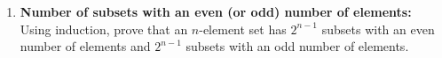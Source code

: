 \begin{enumerate}


\item \textbf{Number of subsets with an even (or odd) number of elements:}
Using induction, prove that an $n$-element set  has $2^{n-1}$ subsets
with an even number of elements and $2^{n-1}$ subsets with an odd number
of elements.

%
%
%
%
%
%
%
%
%
%
%



\end{enumerate}
